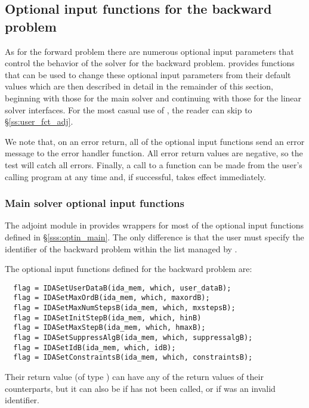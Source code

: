 \subsection{Optional input functions for the backward problem}
\label{ss:optional_input_b}

As for the forward problem there are numerous optional input parameters that
control the behavior of the {\idas} solver for the backward problem. {\idas}
provides functions that can be used to change these optional input parameters
from their default values which are then described in detail in the remainder of
this section, beginning with those for the main {\idas} solver and continuing
with those for the linear solver interfaces. For the most casual use of {\idas},
the reader can skip to \S\ref{ss:user_fct_adj}.

We note that, on an error return, all of the optional input functions send an
error message to the error handler function.
All error return values are negative, so the test  will catch all
errors. Finally, a call to a  function can be made from the
user's calling program at any time and, if successful, takes effect immediately.

\subsubsection{Main solver optional input functions}

The adjoint module in {\idas} provides wrappers for most of the optional
input functions defined in \S\ref{sss:optin_main}. The only difference is
that the user must specify the identifier  of the backward problem
within the list managed by {\idas}.

The optional input functions defined for the backward problem are:
\begin{verbatim}
  flag = IDASetUserDataB(ida_mem, which, user_dataB);
  flag = IDASetMaxOrdB(ida_mem, which, maxordB);
  flag = IDASetMaxNumStepsB(ida_mem, which, mxstepsB);
  flag = IDASetInitStepB(ida_mem, which, hinB)
  flag = IDASetMaxStepB(ida_mem, which, hmaxB);
  flag = IDASetSuppressAlgB(ida_mem, which, suppressalgB);
  flag = IDASetIdB(ida_mem, which, idB);
  flag = IDASetConstraintsB(ida_mem, which, constraintsB);
\end{verbatim}
Their return value  (of type ) can have any of the return values
of their counterparts, but it can also be  if 
has not been called, or  if  was an invalid identifier.

